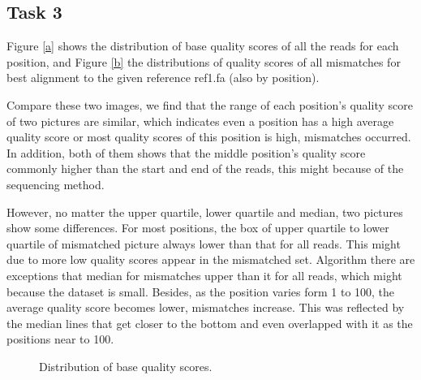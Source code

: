 \documentclass[a4paper]{article}
\begin{document}
\subsection{Task 3}

Figure \ref{a}  shows the distribution of base quality scores of all the reads for each position, and Figure \ref{b} the distributions of quality scores of all mismatches for best alignment to the given reference ref1.fa  (also by position). 

Compare these two images, we find that the range of each position's quality score of two pictures are similar, which indicates even a position has a high average quality score or most quality scores of this position is high, mismatches occurred.  In addition, both of them shows that the middle position's quality score commonly higher than the start and end of the reads, this might because of the sequencing method.

However, no matter the upper quartile, lower quartile and median, two pictures show some differences. For most positions, the box of upper quartile to lower quartile of mismatched picture always lower than that for all reads. This might due to more low quality scores appear in the mismatched set.  Algorithm there are exceptions that median for mismatches upper than it for all reads, which might because the dataset is small. Besides, as the position varies form 1 to 100, the average quality score becomes lower, mismatches increase. This was reflected by the median lines that get closer to the bottom and even overlapped with it as the positions near to 100.

\begin{figure}[!htb]
	
	\centering
	\caption{Distribution of base quality scores.}
	\label{fig:2} 

\end{figure}
 


\end{document}
